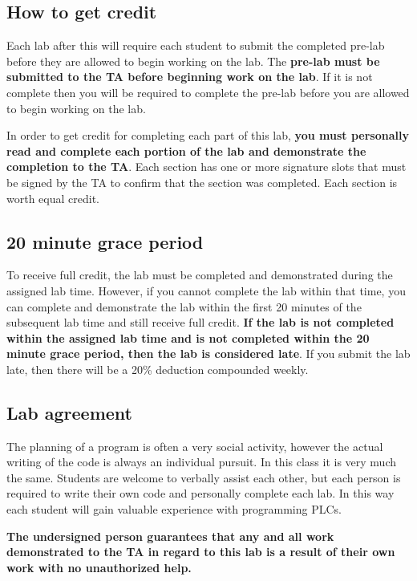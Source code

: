 \subsection{How to get credit}
Each lab after this will require each student to submit the completed pre-lab before they are allowed to begin working on the lab. The \textbf{pre-lab must be submitted to the TA before beginning work on the lab}. If it is not complete then you will be required to complete the pre-lab before you are allowed to begin working on the lab.

In order to get credit for completing each part of this lab, \textbf{you must personally read and complete each portion of the lab and demonstrate the completion to the TA}. Each section has one or more signature slots that must be signed by the TA to confirm that the section was completed. Each section is worth equal credit. 

\subsection{20 minute grace period}
To receive full credit, the lab must be completed and demonstrated during the assigned lab time. However, if you cannot complete the lab within that time, you can complete and demonstrate the lab within the first 20 minutes of the subsequent lab time and still receive full credit. \textbf{If the lab is not completed within the assigned lab time and is not completed within the 20 minute grace period, then the lab is considered late}. If you submit the lab late, then there will be a 20\% deduction compounded weekly.


\subsection{Lab agreement}

The planning of a program is often a very social activity, however the actual writing of the code is always an individual pursuit. In this class it is very much the same. Students are welcome to verbally assist each other, but each person is required to write their own code and personally complete each lab. In this way each student will gain valuable experience with programming PLCs. 

\textbf{The undersigned person guarantees that any and all work demonstrated to the TA in regard to this lab is a result of their own work with no unauthorized help.}



